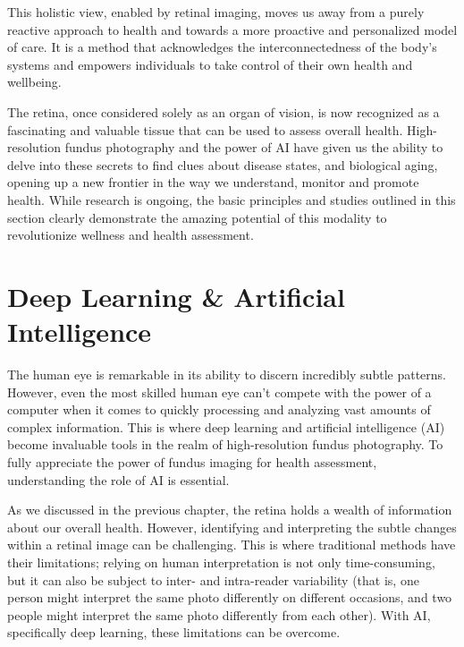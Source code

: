 \documentclass[
  Letterpaper,
]{scrbook}
\begin{document}
This holistic view, enabled by retinal imaging, moves us away from a
purely reactive approach to health and towards a more proactive and
personalized model of care. It is a method that acknowledges the
interconnectedness of the body's systems and empowers individuals to
take control of their own health and wellbeing.

The retina, once considered solely as an organ of vision, is now
recognized as a fascinating and valuable tissue that can be used to
assess overall health. High-resolution fundus photography and the power
of AI have given us the ability to delve into these secrets to find
clues about disease states, and biological aging, opening up a new
frontier in the way we understand, monitor and promote health. While
research is ongoing, the basic principles and studies outlined in this
section clearly demonstrate the amazing potential of this modality to
revolutionize wellness and health assessment.

\section{Deep Learning \& Artificial
Intelligence}\label{deep-learning-artificial-intelligence}

The human eye is remarkable in its ability to discern incredibly subtle
patterns. However, even the most skilled human eye can't compete with
the power of a computer when it comes to quickly processing and
analyzing vast amounts of complex information. This is where deep
learning and artificial intelligence (AI) become invaluable tools in the
realm of high-resolution fundus photography. To fully appreciate the
power of fundus imaging for health assessment, understanding the role of
AI is essential.

As we discussed in the previous chapter, the retina holds a wealth of
information about our overall health. However, identifying and
interpreting the subtle changes within a retinal image can be
challenging. This is where traditional methods have their limitations;
relying on human interpretation is not only time-consuming, but it can
also be subject to inter- and intra-reader variability (that is, one
person might interpret the same photo differently on different
occasions, and two people might interpret the same photo differently
from each other). With AI, specifically deep learning, these limitations
can be overcome.
\end{document}
